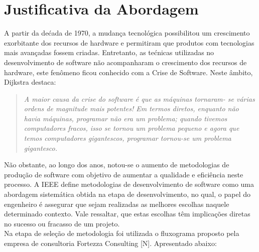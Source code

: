 
\chapter[Justificativa da Abordagem]{Justificativa da Abordagem}

\tab A partir da dećada de 1970, a mudança tecnológica  possibilitou um crescimento exorbitante dos recursos de hardware e permitiram que produtos com tecnologias mais avançadas fossem criadas. Entretanto, as tećnicas utilizadas no desenvolvimento  de software não acompanharam o crescimento dos recursos de hardware, este fenômeno ficou conhecido com a Crise de Software. Neste âmbito, Dijkstra destaca:\\

\begin{quote}
	\textsl
	{
		A maior causa da crise do software é que as máquinas tornaram-
		se várias ordens de magnitude mais potentes! Em termos diretos,
		enquanto não havia máquinas, programar não era um problema;
		quando tivemos computadores fracos, isso se tornou um problema
		pequeno e agora que temos computadores gigantescos, programar
		tornou-se um problema gigantesco.
	}
\end{quote}


\tab Não obstante,  ao longo dos anos, notou-se o aumento de metodologias de produção de software com objetivo de aumentar a qualidade e eficiência neste processo. A IEEE define metodologias de desenvolvimento de software como uma abordagem sistemática obtida na etapa de desenvolvimento, no qual, o papel do engenheiro é assegurar que sejam realizadas as melhores escolhas naquele determinado contexto. Vale ressaltar, que estas escolhas têm implicações diretas no sucesso ou fracasso de um projeto.\\

\tab Na etapa de seleção de metodologia foi utilizada o fluxograma proposto pela empresa de consultoria Fortezza Consulting [N]. Apresentado abaixo: \\ 


